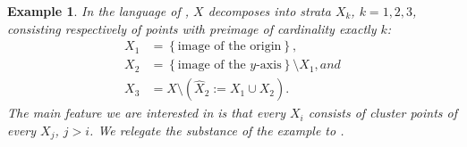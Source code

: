 \documentclass[11pt,leqno]{article}
\theoremstyle{plain}
\theoremstyle{plain}
\theoremstyle{plain}
\newtheorem{example}[lemma]{Example}
\numberwithin{equation}{section}
\theoremstyle{nonumberplain}
\newcommand\1{{\bf 1}}
\begin{document}
\begin{example}
  In the language of \cite[p.340]{pt_brnch}, $X$ decomposes into strata $X_k$, $k=1,2,3$, consisting respectively of points with preimage of cardinality exactly $k$:
  \begin{equation*}
    \begin{aligned}
      X_1
      &=
        \left\{\text{image of the origin}\right\},\\
      X_2
      &=
        \left\{\text{image of the $y$-axis}\right\}\setminus X_1, and\\
      X_3
      &=
        X\setminus \left(\widehat{X}_2:=X_1\cup X_2\right).
    \end{aligned}    
  \end{equation*}
  The main feature we are interested in is that {\it every} $X_i$ consists of cluster points of {\it every} $X_j$, $j>i$. We relegate the substance of the example to .
\end{example}
\end{document}
